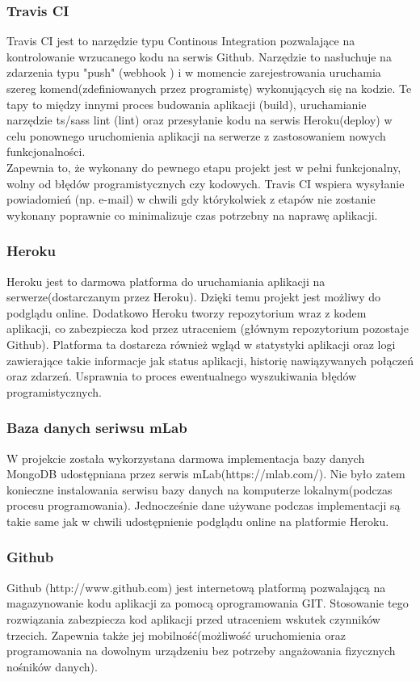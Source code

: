 \documentclass[eng,printmode]{mgr}
\begin{document}
\subsubsection{Travis CI}
Travis CI \cite {TravisCI} jest to narzędzie typu Continous Integration \cite {Keyword_CI} pozwalające na kontrolowanie wrzucanego kodu na serwis Github. Narzędzie to nasłuchuje na zdarzenia typu "push" (webhook \cite {Keyword_Webhook}) i w momencie zarejestrowania uruchamia szereg komend(zdefiniowanych przez programistę) wykonujących się na kodzie. Te tapy to między innymi proces budowania aplikacji (build), uruchamianie narzędzie ts/sass lint (lint) oraz przesyłanie kodu na serwis Heroku(deploy) w celu ponownego uruchomienia aplikacji na serwerze z zastosowaniem nowych funkcjonalności. \\
Zapewnia to, że wykonany do pewnego etapu projekt jest w pełni funkcjonalny, wolny od błędów programistycznych czy kodowych. Travis CI wspiera wysyłanie powiadomień (np. e-mail) w chwili gdy którykolwiek z etapów nie zostanie wykonany poprawnie co minimalizuje czas potrzebny na naprawę aplikacji.

\subsubsection{Heroku}
Heroku \cite{Heroku} jest to darmowa platforma do uruchamiania aplikacji na serwerze(dostarczanym przez Heroku). Dzięki temu projekt jest możliwy do podglądu online. Dodatkowo Heroku tworzy repozytorium wraz z kodem aplikacji, co zabezpiecza kod przez utraceniem (głównym repozytorium pozostaje Github). Platforma ta dostarcza również wgląd w statystyki aplikacji oraz logi zawierające takie informacje jak status aplikacji, historię nawiązywanych połączeń oraz zdarzeń. Usprawnia to proces ewentualnego wyszukiwania błędów programistycznych.

\subsubsection{Baza danych seriwsu mLab}
W projekcie została wykorzystana darmowa implementacja bazy danych MongoDB udostępniana przez serwis mLab(https://mlab.com/). Nie było zatem konieczne instalowania serwisu bazy danych na komputerze lokalnym(podczas procesu programowania). Jednocześnie dane używane podczas implementacji są takie same jak w chwili udostępnienie podglądu online na platformie Heroku.

\subsubsection{Github}
Github (http://www.github.com) jest internetową platformą pozwalającą na magazynowanie kodu aplikacji za pomocą oprogramowania GIT. Stosowanie tego rozwiązania zabezpiecza kod aplikacji przed utraceniem wskutek czynników trzecich. Zapewnia także jej mobilność(możliwość uruchomienia oraz programowania na dowolnym urządzeniu bez potrzeby angażowania fizycznych nośników danych).
\\
\\
\end{document}

